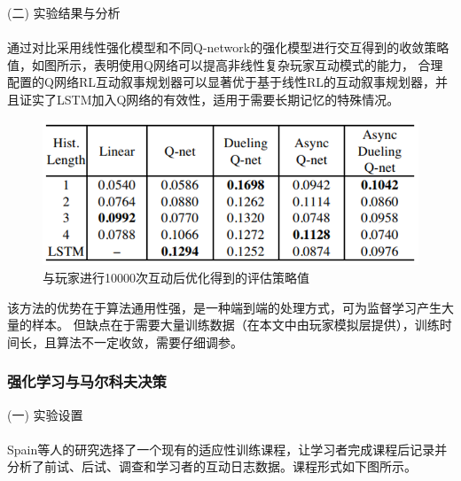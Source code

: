 \documentclass[12pt]{article}
\begin{document}
            (二) 实验结果与分析\paragraph{}
            通过对比采用线性强化模型和不同Q-network的强化模型进行交互得到的收敛策略值，如图所示，表明使用Q网络可以提高非线性复杂玩家互动模式的能力，
            合理配置的Q网络RL互动叙事规划器可以显著优于基于线性RL的互动叙事规划器，并且证实了LSTM加入Q网络的有效性，适用于需要长期记忆的特殊情况。
            \begin{figure}[H]
            	
            	\centering
            	\includegraphics[scale=0.6]{images/policy_value.png}
            	\caption{与玩家进行10000次互动后优化得到的评估策略值}
            	\label{fig:label}
            \end{figure}

            该方法的优势在于算法通用性强，是一种端到端的处理方式，可为监督学习产生大量的样本。
            但缺点在于需要大量训练数据（在本文中由玩家模拟层提供），训练时间长，且算法不一定收敛，需要仔细调参。

            \subsubsection{强化学习与马尔科夫决策}
            (一) 实验设置\paragraph{}
            Spain等人\cite{ref14}的研究选择了一个现有的适应性训练课程，让学习者完成课程后记录并分析了前试、后试、调查和学习者的互动日志数据。课程形式如下图所示。
\end{document}
